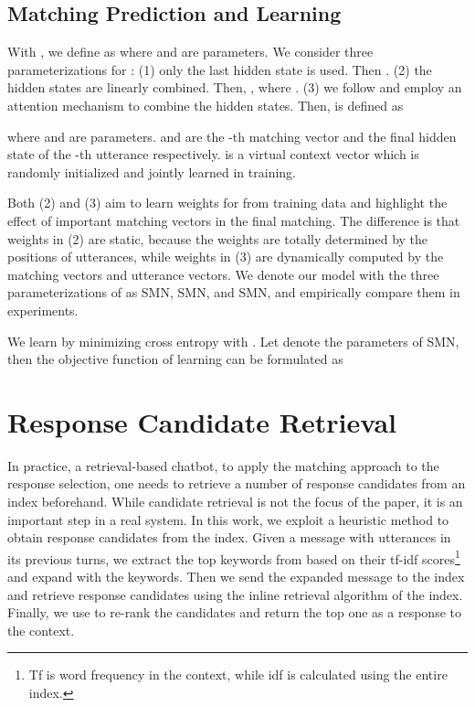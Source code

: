 \documentclass[11pt,a4paper]{article}
\begin{document}
	
	\subsection{Matching Prediction and Learning}
	With , we define  as
		where  and  are parameters.
	We consider three parameterizations for : (1) only the last hidden state is used. Then . (2) the hidden states are linearly combined. Then, , where . (3) we follow \cite{yang2016hierarchical} and employ an attention mechanism to combine the hidden states. Then,  is defined as 
	
	
\begin{small}
	
	\end{small}where  and  are parameters.  and  are the -th matching vector and the final hidden state of the -th utterance respectively.  is a virtual context vector which is randomly initialized and jointly learned in training.
	
	Both (2) and (3) aim to learn weights for  from training data and highlight the effect of important matching vectors in the final matching. The difference is that weights in (2) are static, because the weights are totally determined by the positions of utterances, while weights in (3) are dynamically computed by the matching vectors and utterance vectors. We denote our model with the three parameterizations of  as SMN, SMN, and SMN, and empirically compare them in experiments.
	
	
	We learn  by minimizing cross entropy with . Let  denote the parameters of SMN, then the objective function  of learning can be formulated as  
	


	
	
	\section{Response Candidate Retrieval} \label{candidate_retrieval}
	In practice, a retrieval-based chatbot, to apply the matching approach to the response selection, one needs to retrieve a number of response candidates from an index beforehand. While candidate retrieval is not the focus of the paper, it is an important step in a real system. In this work, we exploit a heuristic method to obtain response candidates from the index. Given a message  with  utterances in its previous turns, we extract the top  keywords from  based on their tf-idf  scores\footnote{Tf is word frequency in the context, while idf is calculated using the entire index.} and expand  with the keywords. Then we send the expanded message to the index and retrieve response candidates using the inline retrieval algorithm of the index. Finally, we use  to re-rank the candidates and return the top one as a response to the context.  
	
\end{document}

